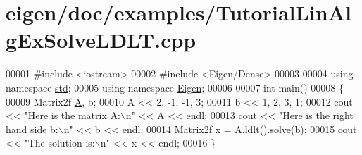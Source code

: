 \hypertarget{eigen_2doc_2examples_2_tutorial_lin_alg_ex_solve_l_d_l_t_8cpp_source}{}\section{eigen/doc/examples/\+Tutorial\+Lin\+Alg\+Ex\+Solve\+L\+D\+LT.cpp}
\label{eigen_2doc_2examples_2_tutorial_lin_alg_ex_solve_l_d_l_t_8cpp_source}

\begin{DoxyCode}
00001 \textcolor{preprocessor}{#include <iostream>}
00002 \textcolor{preprocessor}{#include <Eigen/Dense>}
00003 
00004 \textcolor{keyword}{using namespace }\hyperlink{namespacestd}{std};
00005 \textcolor{keyword}{using namespace }\hyperlink{namespace_eigen}{Eigen};
00006 
00007 \textcolor{keywordtype}{int} main()
00008 \{
00009    Matrix2f \hyperlink{group___core___module_class_eigen_1_1_matrix}{A}, b;
00010    A << 2, -1, -1, 3;
00011    b << 1, 2, 3, 1;
00012    cout << \textcolor{stringliteral}{"Here is the matrix A:\(\backslash\)n"} << A << endl;
00013    cout << \textcolor{stringliteral}{"Here is the right hand side b:\(\backslash\)n"} << b << endl;
00014    Matrix2f x = A.ldlt().solve(b);
00015    cout << \textcolor{stringliteral}{"The solution is:\(\backslash\)n"} << x << endl;
00016 \}
\end{DoxyCode}
